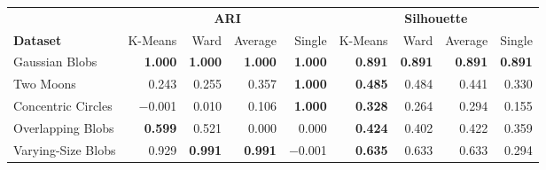 \begin{tabular}{lrrrrrrrr}
\toprule
& \multicolumn{4}{c}{\textbf{ARI}} & \multicolumn{4}{c}{\textbf{Silhouette}} \\
\cmidrule(lr){2-5}\cmidrule(lr){6-9}
\textbf{Dataset} & K-Means & Ward & Average & Single & K-Means & Ward & Average & Single \\
\midrule
Gaussian Blobs & \textbf{1.000} & \textbf{1.000} & \textbf{1.000} & \textbf{1.000} & \textbf{0.891} & \textbf{0.891} & \textbf{0.891} & \textbf{0.891} \\
Two Moons & 0.243 & 0.255 & 0.357 & \textbf{1.000} & \textbf{0.485} & 0.484 & 0.441 & 0.330 \\
Concentric Circles & $-$0.001 & 0.010 & 0.106 & \textbf{1.000} & \textbf{0.328} & 0.264 & 0.294 & 0.155 \\
Overlapping Blobs & \textbf{0.599} & 0.521 & 0.000 & 0.000 & \textbf{0.424} & 0.402 & 0.422 & 0.359 \\
Varying-Size Blobs & 0.929 & \textbf{0.991} & \textbf{0.991} & $-$0.001 & \textbf{0.635} & 0.633 & 0.633 & 0.294 \\
\bottomrule
\end{tabular}
